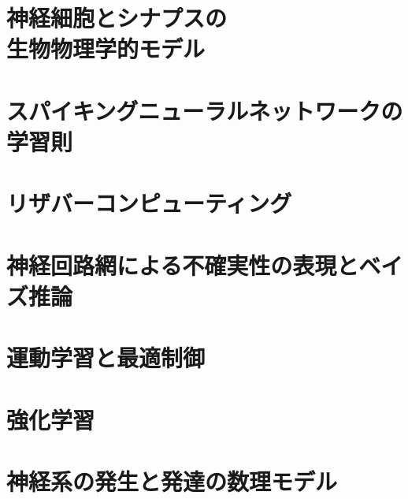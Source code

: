 \documentclass[titlepage]{ltjsbook}
\begin{document}
\chapter[神経細胞とシナプスの生物物理学的モデル]{神経細胞とシナプスの\\生物物理学的モデル}
\chapter{スパイキングニューラルネットワークの学習則}
\chapter{リザバーコンピューティング}
\chapter{神経回路網による不確実性の表現とベイズ推論}
\chapter{運動学習と最適制御}
\chapter{強化学習}
\chapter{神経系の発生と発達の数理モデル}


\end{document}

